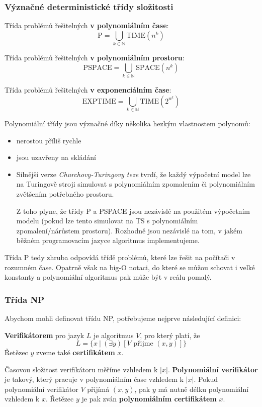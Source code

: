 \documentclass[11pt]{report} %
\newcommand{\N}{\mathbb{N}}
\numberwithin{equation}{section}
\begin{document}
\subsubsection{Význačné deterministické třídy složitosti}
Třída problémů řešitelných \textbf{v polynomiálním čase}:
$$\text{P} = \bigcup_{k\in\N} \text{TIME}(n^k)$$

Třída problémů řešitelných \textbf{v polynomiálním prostoru}:
$$\text{PSPACE} = \bigcup_{k\in\N} \text{SPACE}(n^k)$$

Třída problémů řešitelných \textbf{v exponenciálním čase}:
$$\text{EXPTIME} = \bigcup_{k\in\N} \text{TIME}(2^{n^k})$$

Polynomiální třídy jsou význačné díky několika hezkým vlastnostem polynomů:
\begin{itemize}
	
	
	\item nerostou příliš rychle
	\item jsou uzavřeny na skládání
	\item Silnější verze \textit{Churchovy-Turingovy teze} tvrdí, že každý  výpočetní
	model lze na Turingově stroji simulovat s polynomiálním zpomalením či polynomiálním zvětšením potřebného prostoru. 
	
	Z toho plyne, že třídy P a PSPACE jsou nezávislé na použitém výpočetním modelu (pokud lze tento simulovat na TS s polynomiálním zpomalení/nárůstem prostoru). Rozhodně jsou nezávislé na tom, v jakém běžném programovacím jazyce algoritmus implementujeme. 
\end{itemize}

Třída P tedy zhruba odpovídá třídě problémů, které lze řešit na počítači v rozumném čase. Opatrně však na big-O notaci, do které se můžou schovat i velké konstanty a polynomiální algoritmus pak může být v reálu pomalý.

\subsubsection{Třída NP}
Abychom mohli definovat třídu NP, potřebujeme nejprve následující definici:

\textbf{Verifikátorem} pro jazyk $L$ je algoritmus $V$, pro který platí, že
$$L = \{x\ |\ (\exists y)[V \text{ přijme } (x, y)]\}$$
Řetězec $y$ zveme také \textbf{certifikátem} $x$.

Časovou složitost verifikátoru měříme vzhledem k $|x|$. \textbf{Polynomiální verifikátor} je takový, který pracuje v polynomiálním čase vzhledem k $|x|$. Pokud polynomiální verifikátor $V$ přijímá $(x, y)$, pak $y$ má nutně délku polynomiální vzhledem k $x$. Řetězec $y$ je pak zván \textbf{polynomiálním certifikátem} $x$.	
\end{document}
